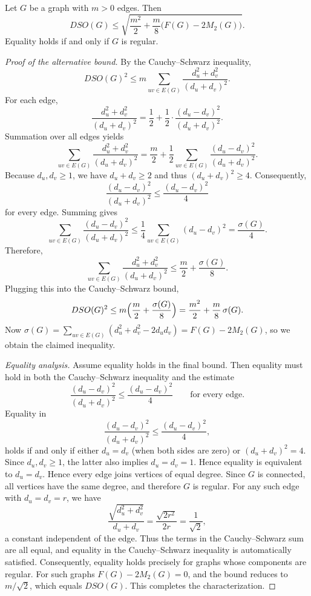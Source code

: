 \documentclass[10pt,a4paper]{amsart}
\begin{document}
\begin{theorem}\label{alt}
Let $G$ be a  graph with $m>0$ edges. Then
\[
DSO(G) \le \sqrt{\frac{m^{2}}{2}+\frac{m}{8}\bigl(F(G)-2M_{2}(G)\bigr)}.
\]
Equality holds if and only if $G$ is regular.
\end{theorem}

\begin{proof}[Proof of the alternative bound]
By the Cauchy--Schwarz inequality,
\[
DSO(G)^{2} \le m\sum_{uv\in E(G)} \frac{d_u^{2}+d_v^{2}}{(d_u+d_v)^{2}}.
\]
For each edge,
\[
\frac{d_u^{2}+d_v^{2}}{(d_u+d_v)^{2}}
= \frac12+\frac12\cdot\frac{(d_u-d_v)^{2}}{(d_u+d_v)^{2}}.
\]
Summation over all edges yields
\[
\sum_{uv\in E(G)}\frac{d_u^{2}+d_v^{2}}{(d_u+d_v)^{2}}
= \frac{m}{2}+\frac12\sum_{uv\in E(G)}\frac{(d_u-d_v)^{2}}{(d_u+d_v)^{2}}.
\]
Because $d_u,d_v\ge 1$, we have $d_u+d_v\ge 2$ and thus $(d_u+d_v)^{2}\ge 4$.
Consequently,
\[
\frac{(d_u-d_v)^{2}}{(d_u+d_v)^{2}} \le \frac{(d_u-d_v)^{2}}{4}
\]
for every edge. Summing gives
\[
\sum_{uv\in E(G)}\frac{(d_u-d_v)^{2}}{(d_u+d_v)^{2}}
\le \frac14\sum_{uv\in E(G)}(d_u-d_v)^{2}
= \frac{\sigma(G)}{4}.
\]
Therefore,
\[
\sum_{uv\in E(G)}\frac{d_u^{2}+d_v^{2}}{(d_u+d_v)^{2}}
\le \frac{m}{2}+\frac{\sigma(G)}{8}.
\]
Plugging this into the Cauchy--Schwarz bound,
\[
DSO(G)^{2} \le m\Bigl(\frac{m}{2}+\frac{\sigma(G)}{8}\Bigr)
= \frac{m^{2}}{2}+\frac{m}{8}\,\sigma(G).
\]
Now $\sigma(G)=\sum_{uv\in E(G)}(d_u^{2}+d_v^{2}-2d_ud_v)=F(G)-2M_{2}(G)$, so we obtain the claimed inequality.

\medskip
\noindent\textit{Equality analysis.}
Assume equality holds in the final bound.
Then equality must hold in both the Cauchy--Schwarz inequality and the estimate
\[
\frac{(d_u-d_v)^{2}}{(d_u+d_v)^{2}} \le \frac{(d_u-d_v)^{2}}{4} \qquad\text{for every edge}.
\]
Equality in
\[
\frac{(d_u-d_v)^2}{(d_u+d_v)^2}
\le
\frac{(d_u-d_v)^2}{4},
\]
holds if and only if either $d_u=d_v$ (when both sides are zero) or
$(d_u+d_v)^2=4$.
Since $d_u,d_v\ge1$, the latter also implies $d_u=d_v=1$.
Hence equality is equivalent to $d_u=d_v$.
Hence every edge joins vertices of equal degree. Since $G$ is connected,
all vertices have the same degree, and therefore $G$ is regular. For any such edge with $d_u=d_v=r$, we have
\[
\frac{\sqrt{d_u^{2}+d_v^{2}}}{d_u+d_v} = \frac{\sqrt{2r^{2}}}{2r} = \frac{1}{\sqrt{2}},
\]
a constant independent of the edge. Thus the terms in the Cauchy--Schwarz sum are all equal, and equality in the Cauchy--Schwarz inequality is automatically satisfied.
Consequently, equality holds precisely for graphs whose components are regular.
For such graphs $F(G)-2M_{2}(G)=0$, and the bound reduces to $m/\sqrt{2}$, which equals $DSO(G)$.
This completes the characterization.
\end{proof}
\end{document}

